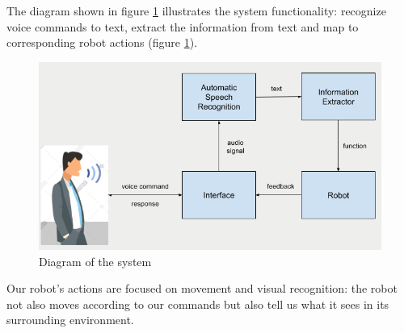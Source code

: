 The diagram shown in figure \ref{fig:diagramSystem} illustrates the system functionality: recognize voice commands to text, extract the information from text and map to corresponding robot actions (figure \ref{fig:diagramSystem}). 
\begin{figure}[tb]
\centering
\includegraphics[width = 0.7\hsize]{./figures/diagramSystem}
\caption{Diagram of the system}
\label{fig:diagramSystem}
\end{figure}

Our robot's actions are focused on movement and visual recognition: the robot not also moves according to our commands but also tell us what it sees in its surrounding environment.  

